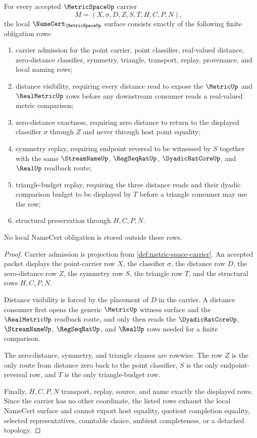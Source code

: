 \begin{theorem}
\label{thm:metric-space-namecert-obligations}
For every accepted $\MetricSpaceUp$ carrier
$$
M=(X,\sigma,D,Z,S,T,H,C,P,N),
$$
the local $\NameCert_{\MetricSpaceUp}$ surface consists exactly of the following finite obligation rows:
\begin{enumerate}
\item carrier admission for the point carrier, point classifier, real-valued distance, zero-distance classifier, symmetry, triangle, transport, replay, provenance, and local naming rows;
\item distance visibility, requiring every distance read to expose the $\MetricUp$ and $\RealMetricUp$ rows before any downstream consumer reads a real-valued metric comparison;
\item zero-distance exactness, requiring zero distance to return to the displayed classifier $\sigma$ through $Z$ and never through host point equality;
\item symmetry replay, requiring endpoint reversal to be witnessed by $S$ together with the same $\StreamNameUp$, $\RegSeqRatUp$, $\DyadicRatCoreUp$, and $\RealUp$ readback route;
\item triangle-budget replay, requiring the three distance reads and their dyadic comparison budget to be displayed by $T$ before a triangle consumer may use the row;
\item structural preservation through $H,C,P,N$.
\end{enumerate}
No local NameCert obligation is stored outside these rows.
\end{theorem}
\begin{proof}
Carrier admission is projection from \autoref{def:metric-space-carrier}. An accepted packet displays the point-carrier row $X$, the classifier $\sigma$, the distance row $D$, the zero-distance row $Z$, the symmetry row $S$, the triangle row $T$, and the structural rows $H,C,P,N$.

Distance visibility is forced by the placement of $D$ in the carrier. A distance consumer first opens the generic $\MetricUp$ witness surface and the $\RealMetricUp$ readback route, and only then reads the $\DyadicRatCoreUp$, $\StreamNameUp$, $\RegSeqRatUp$, and $\RealUp$ rows needed for a finite comparison.

The zero-distance, symmetry, and triangle clauses are rowwise. The row $Z$ is the only route from distance zero back to the point classifier, $S$ is the only endpoint-reversal row, and $T$ is the only triangle-budget row.

Finally, $H,C,P,N$ transport, replay, source, and name exactly the displayed rows. Since the carrier has no other coordinate, the listed rows exhaust the local NameCert surface and cannot export host equality, quotient completion equality, selected representatives, countable choice, ambient completeness, or a detached topology.
\end{proof}

